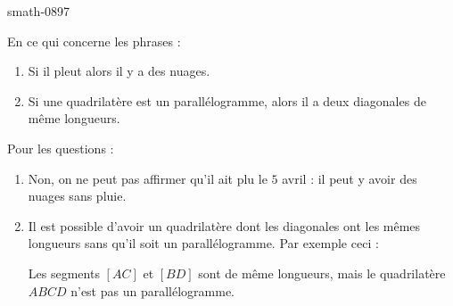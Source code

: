 
\begin{corrige}{smath-0897}

    En ce qui concerne les phrases :
    \begin{enumerate}
        \item
            Si il pleut alors il y a des nuages.
        \item
            Si une quadrilatère est un parallélogramme, alors il a deux diagonales de même longueurs.
    \end{enumerate}
    Pour les questions :
    \begin{enumerate}
        \item
            Non, on ne peut pas affirmer qu'il ait plu le \( 5\) avril : il peut y avoir des nuages sans pluie.
        \item
            Il est possible d'avoir un quadrilatère dont les diagonales ont les mêmes longueurs sans qu'il soit un parallélogramme. Par exemple ceci :
\begin{center}
   
\end{center}
Les segments \( [AC]\) et \( [BD]\) sont de même longueurs, mais le quadrilatère \( ABCD\) n'est pas un parallélogramme.
    \end{enumerate}

\end{corrige}
